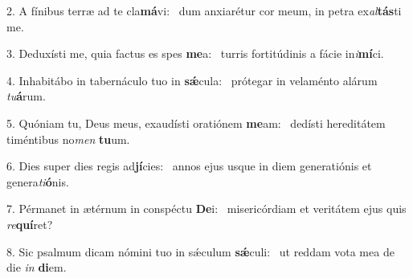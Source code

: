 2. A fínibus terræ ad te cla\textbf{má}vi: \ast\  dum anxiarétur cor meum, in petra ex\textit{al}\textbf{tás}ti me.\

3. Deduxísti me, quia factus es spes \textbf{me}a: \ast\  turris fortitúdinis a fácie in\textit{i}\textbf{mí}ci.\

4. Inhabitábo in tabernáculo tuo in \textbf{sǽ}cula: \ast\  prótegar in velaménto alárum \textit{tu}\textbf{á}rum.\

5. Quóniam tu, Deus meus, exaudísti oratiónem \textbf{me}am: \ast\  dedísti hereditátem timéntibus no\textit{men} \textbf{tu}um.\

6. Dies super dies regis ad\textbf{jí}cies: \ast\  annos ejus usque in diem generatiónis et genera\textit{ti}\textbf{ó}nis.\

7. Pérmanet in ætérnum in conspéctu \textbf{De}i: \ast\  misericórdiam et veritátem ejus quis \textit{re}\textbf{quí}ret?\

8. Sic psalmum dicam nómini tuo in sǽculum \textbf{sǽ}culi: \ast\  ut reddam vota mea de die \textit{in} \textbf{di}em.\


